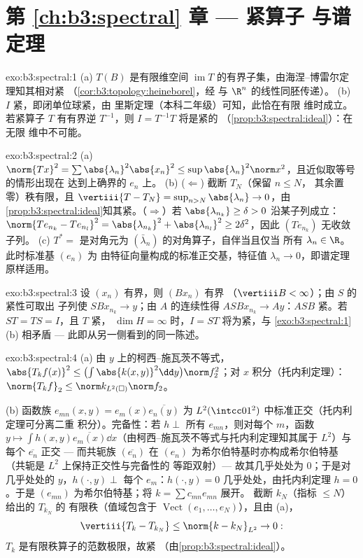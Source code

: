 \section*{第 \ref{ch:b3:spectral} 章 --- 紧算子
与谱定理}

\begin{solution}{exo:b3:spectral:1}
(a) $T(B)$ 是有限维空间
$\operatorname{im}T$ 的有界子集，由海涅–博雷尔定理知其相对紧
（\cref{cor:b3:topology:heineborel}，经
与 $\R^n$ 的线性同胚传递）。
(b) $I$ 紧，即闭单位球紧，由
里斯定理（本科二年级）可知，此恰在有限
维时成立。若紧算子 $T$ 有有界逆 $T^{-1}$，则
$I = T^{-1}T$ 将是紧的
（\cref{prop:b3:spectral:ideal}）：在无限
维中不可能。
\end{solution}

\begin{solution}{exo:b3:spectral:2}
(a) $\norm{Tx}^2 = \sum\abs{\lambda_n}^2\abs{x_n}^2 \leq
\sup\abs{\lambda_n}^2\norm x^2$，且近似取等号的情形出现在
达到上确界的 $e_n$ 上。
(b) ($\Leftarrow$) 截断 $T_N$（保留 $n \leq N$，
其余置零）秩有限，且 $\vertiii{T - T_N} =
\sup_{n>N}\abs{\lambda_n} \to 0$，由
\cref{prop:b3:spectral:ideal}知其紧。（$\Rightarrow$）若
$\abs{\lambda_{n_k}} \geq \delta > 0$ 沿某子列成立：
$\norm{Te_{n_k} - Te_{n_l}}^2 = \abs{\lambda_{n_k}}^2 +
\abs{\lambda_{n_l}}^2 \geq 2\delta^2$，因此
$(Te_{n_k})$ 无收敛子列。
(c) $T^* = $ 是对角元为 $(\bar\lambda_n)$ 的对角算子，自伴当且仅当
所有 $\lambda_n \in \R$。此时标准基 $(e_n)$ 为
由特征向量构成的标准正交基，特征值 $\lambda_n \to
0$，即谱定理原样适用。
\end{solution}

\begin{solution}{exo:b3:spectral:3}
设 $(x_n)$ 有界，则 $(Bx_n)$ 有界
（$\vertiii B < \infty$）；由 $S$ 的紧性可取出
子列使 $SBx_{n_k} \to y$；由 $A$ 的连续性得 $ASBx_{n_k} \to
Ay$：$ASB$ 紧。若 $ST = TS = I$，且 $T$ 紧，
$\dim H = \infty$ 时，$I = ST$ 将为紧，与
\cref{exo:b3:spectral:1}(b) 相矛盾 ---
此即从另一侧看到的同一陈述。
\end{solution}

\begin{solution}{exo:b3:spectral:4}
(a) 由 $y$ 上的柯西–施瓦茨不等式，$\abs{T_kf(x)}^2 \leq
\bigl(\int\abs{k(x,y)}^2\dd y\bigr)\norm f_2^2$；对
$x$ 积分（托内利定理）：$\norm{T_kf}_2 \leq \norm k_{L^2(\square)}
\norm f_2$。

(b) 函数族 $e_{mn}(x,y) = e_m(x)\overline{e_n(y)}$ 为
$L^2(\intcc01^2)$ 中标准正交（托内利定理可分离二重
积分）。完备性：若 $h \perp$ 所有 $e_{mn}$，则对每个
$m$，函数 $y \mapsto \int h(x,y)\overline{e_m(x)}\dd
x$（由柯西–施瓦茨不等式与托内利定理知其属于 $L^2$）与
每个 $\overline{e_n}$ 正交 --- 而共轭族
$(\overline{e_n})$ 在 $(e_n)$ 为希尔伯特基时亦构成希尔伯特基
（共轭是 $L^2$ 上保持正交性与完备性的
等距双射）--- 故其几乎处处为 $0$；于是对几乎处处的 $y$，$h(\cdot, y) \perp$ 每个
$e_m$：$h(\cdot, y) = 0$ 几乎处处，由托内利定理 $h = 0$。于是
$(e_{mn})$ 为希尔伯特基；将 $k = \sum c_{mn}e_{mn}$ 展开。
截断 $k_N$（指标 $\leq N$）给出的 $T_{k_N}$ 的
有限秩（值域包含于 $\operatorname{Vect}(e_1, \dots,
e_N)$），且由 (a)，
\[
\vertiii{T_k - T_{k_N}} \leq \norm{k - k_N}_{L^2} \to 0 :
\]
$T_k$ 是有限秩算子的范数极限，故紧
（由\cref{prop:b3:spectral:ideal}）。
\end{solution}

